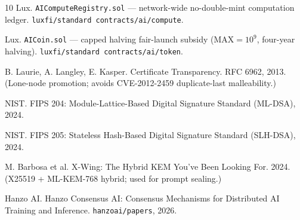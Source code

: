 \documentclass[11pt]{article}
\newcommand{\code}[1]{\texttt{#1}}
\begin{document}
\begin{thebibliography}{10}
Lux. \code{AIComputeRegistry.sol} --- network-wide no-double-mint computation
ledger. \code{luxfi/standard contracts/ai/compute}.

Lux. \code{AICoin.sol} --- capped halving fair-launch subsidy
($\mathrm{MAX}=10^9$, four-year halving). \code{luxfi/standard contracts/ai/token}.

B. Laurie, A. Langley, E. Kasper. Certificate Transparency. RFC 6962, 2013.
(Lone-node promotion; avoids CVE-2012-2459 duplicate-last malleability.)

NIST. FIPS 204: Module-Lattice-Based Digital Signature Standard (ML-DSA), 2024.

NIST. FIPS 205: Stateless Hash-Based Digital Signature Standard (SLH-DSA), 2024.

M. Barbosa et al. X-Wing: The Hybrid KEM You've Been Looking For. 2024.
(X25519 + ML-KEM-768 hybrid; used for prompt sealing.)

Hanzo AI. Hanzo Consensus AI: Consensus Mechanisms for Distributed AI Training
and Inference. \texttt{hanzoai/papers}, 2026.

\end{thebibliography}
\end{document}
